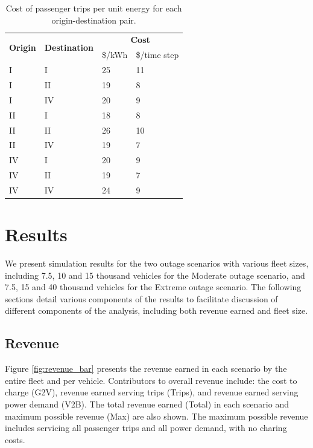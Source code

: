 \documentclass[journal]{IEEEtran}
\begin{document}
\begin{table}[!htbp]
    \renewcommand{\arraystretch}{1}
    \caption{Cost of passenger trips per unit energy for each origin-destination pair.}
    \label{tab:trip_costs}
    \centering
    \def\colmargin{6.75cm}
    \begin{tabular}{llll}
    \hline
    \multirow{2}{*}{\textbf{Origin}} & \multirow{2}{*}{\textbf{Destination}} & \multicolumn{2}{c}{\textbf{Cost}} \\
     &  & \$/kWh & \$/time step \\
    \hline
    I  & I  & 25 & 11 \\
    I  & II & 19 & 8 \\
    I  & IV & 20 & 9 \\
    II & I  & 18 & 8 \\
    II & II & 26 & 10 \\
    II & IV & 19 & 7 \\
    IV & I  & 20 & 9 \\
    IV & II & 19 & 7 \\
    IV & IV & 24 & 9 \\
    \hline
    \end{tabular}
\end{table}

\section{Results}
We present simulation results for the two outage scenarios with various fleet sizes, including 7.5, 10 and 15 thousand vehicles for the Moderate outage scenario, and 7.5, 15 and 40 thousand vehicles for the Extreme outage scenario. The following sections detail various components of the results to facilitate discussion of different components of the analysis, including both revenue earned and fleet size.

\subsection{Revenue}
Figure \ref{fig:revenue_bar} presents the revenue earned in each scenario by the entire fleet and per vehicle. Contributors to overall revenue include: the cost to charge (G2V), revenue earned serving trips (Trips), and revenue earned serving power demand (V2B). The total revenue earned (Total) in each scenario and maximum possible revenue (Max) are also shown. The maximum possible revenue includes servicing all passenger trips and all power demand, with no charing costs.
\end{document}
